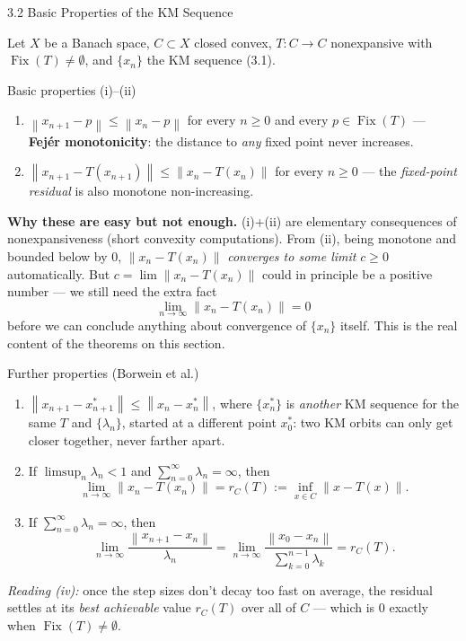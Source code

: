 \documentclass[aspectratio=169,10pt]{beamer}
\newcommand{\Fix}{\operatorname{Fix}}
\newcommand{\norm}[1]{\left\|#1\right\|}
\begin{document}
\begin{frame}[allowframebreaks]{3.2 Basic Properties of the KM Sequence}

  Let $X$ be a Banach space, $C\subset X$ closed convex, $T:C\to C$
  nonexpansive with $\Fix(T)\ne\emptyset$, and $\{x_n\}$ the KM sequence
  (3.1).

  \begin{block}{Basic properties (i)--(ii)}
    \begin{enumerate}
      \item[(i)] $\norm{x_{n+1}-p}\le\norm{x_n-p}$ for every $n\ge0$ and
        every $p\in\Fix(T)$ --- \textbf{Fej\'er monotonicity}: the
        distance to \emph{any} fixed point never increases.
      \item[(ii)] $\norm{x_{n+1}-T(x_{n+1})}\le\norm{x_n-T(x_n)}$ for
        every $n\ge0$ --- the \emph{fixed-point residual} is also
        monotone non-increasing.
    \end{enumerate}
  \end{block}

  \textbf{Why these are easy but not enough.} (i)+(ii) are elementary
  consequences of nonexpansiveness (short convexity computations). From
  (ii), being monotone and bounded below by 0, $\norm{x_n-T(x_n)}$
  \emph{converges to some limit} $c\ge0$ automatically. But
  $c=\lim\norm{x_n-T(x_n)}$ could in principle be a positive number ---
  we still need the extra fact
  $$\lim_{n\to\infty}\norm{x_n-T(x_n)}=0$$
  before we can conclude anything about convergence of $\{x_n\}$ itself.
  This is the real content of the theorems on this section.

  \framebreak

  \begin{block}{Further properties (Borwein et al.)}
    \begin{enumerate}
      \item[(iii)] $\norm{x_{n+1}-x^*_{n+1}}\le\norm{x_n-x^*_n}$, where
        $\{x^*_n\}$ is \emph{another} KM sequence for the same $T$ and
        $\{\lambda_n\}$, started at a different point $x_0^*$: two KM
        orbits can only get closer together, never farther apart.
      \item[(iv)] If $\limsup_n\lambda_n<1$ and $\sum_{n=0}^\infty
        \lambda_n=\infty$, then
        $$\lim_{n\to\infty}\norm{x_n-T(x_n)}=r_C(T):=\inf_{x\in C}\norm{x-T(x)}.$$
      \item[(v)] If $\sum_{n=0}^\infty\lambda_n=\infty$, then
        $$\lim_{n\to\infty}\frac{\norm{x_{n+1}-x_n}}{\lambda_n}
          =\lim_{n\to\infty}\frac{\norm{x_0-x_n}}{\sum_{k=0}^{n-1}\lambda_k}=r_C(T).$$
    \end{enumerate}
  \end{block}
  \emph{Reading (iv):} once the step sizes don't decay too fast on
  average, the residual settles at its \emph{best achievable} value
  $r_C(T)$ over all of $C$ --- which is $0$ exactly when $\Fix(T)\ne\emptyset$.
\end{frame}
\end{document}
